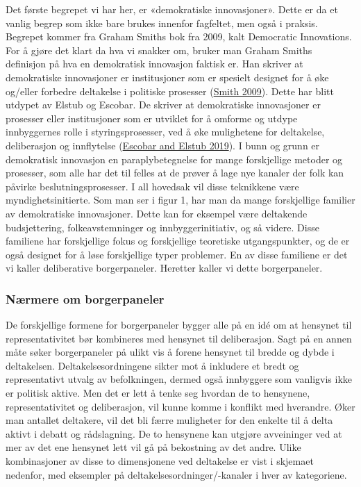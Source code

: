 \documentclass[
  12pt,
  a4paper, 12pt]{article}
\begin{document}
Det første begrepet vi har her, er «demokratiske innovasjoner». Dette er da et vanlig begrep som ikke bare brukes innenfor fagfeltet, men også i praksis. Begrepet kommer fra Graham Smiths bok fra 2009, kalt Democratic Innovations. For å gjøre det klart da hva vi snakker om, bruker man Graham Smiths definisjon på hva en demokratisk innovasjon faktisk er. Han skriver at demokratiske innovasjoner er institusjoner som er spesielt designet for å øke og/eller forbedre deltakelse i politiske prosesser (\protect\hyperlink{ref-smith_democratic_2009}{Smith 2009}). Dette har blitt utdypet av Elstub og Escobar. De skriver at demokratiske innovasjoner er prosesser eller institusjoner som er utviklet for å omforme og utdype innbyggernes rolle i styringsprosesser, ved å øke mulighetene for deltakelse, deliberasjon og innflytelse (\protect\hyperlink{ref-escobar_defining_2019}{Escobar and Elstub 2019}). I bunn og grunn er demokratisk innovasjon en paraplybetegnelse for mange forskjellige metoder og prosesser, som alle har det til felles at de prøver å lage nye kanaler der folk kan påvirke beslutningsprosesser. I all hovedsak vil disse teknikkene være myndighetsinitierte. Som man ser i figur 1, har man da mange forskjellige familier av demokratiske innovasjoner. Dette kan for eksempel være deltakende budsjettering, folkeavstemninger og innbyggerinitiativ, og så videre. Disse familiene har forskjellige fokus og forskjellige teoretiske utgangspunkter, og de er også designet for å løse forskjellige typer problemer. En av disse familiene er det vi kaller deliberative borgerpaneler. Heretter kaller vi dette borgerpaneler.

\hypertarget{nuxe6rmere-om-borgerpaneler}{%
\subsubsection{Nærmere om borgerpaneler}\label{nuxe6rmere-om-borgerpaneler}}

De forskjellige formene for borgerpaneler bygger alle på en idé om at hensynet til representativitet bør kombineres med hensynet til deliberasjon. Sagt på en annen måte søker borgerpaneler på ulikt vis å forene hensynet til bredde og dybde i deltakelsen. Deltakelsesordningene sikter mot å inkludere et bredt og representativt utvalg av befolkningen, dermed også innbyggere som vanligvis ikke er politisk aktive. Men det er lett å tenke seg hvordan de to hensynene, representativitet og deliberasjon, vil kunne komme i konflikt med hverandre. Øker man antallet deltakere, vil det bli færre muligheter for den enkelte til å delta aktivt i debatt og rådslagning. De to hensynene kan utgjøre avveininger ved at mer av det ene hensynet lett vil gå på bekostning av det andre. Ulike kombinasjoner av disse to dimensjonene ved deltakelse er vist i skjemaet nedenfor, med eksempler på deltakelsesordninger/-kanaler i hver av kategoriene.
\end{document}
